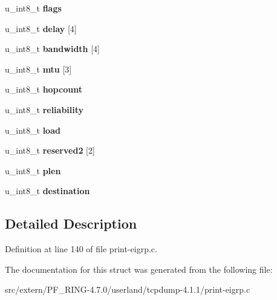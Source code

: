 \begin{DoxyCompactItemize}
\item 
\hypertarget{structeigrp__tlv__ip__ext__t_a009ec12f15263771659f1a5bf27f7c83}{
u\_\-int8\_\-t {\bfseries flags}}
\label{structeigrp__tlv__ip__ext__t_a009ec12f15263771659f1a5bf27f7c83}

\item 
\hypertarget{structeigrp__tlv__ip__ext__t_a27abf8b5a3bb6f018f62065d6fd05079}{
u\_\-int8\_\-t {\bfseries delay} \mbox{[}4\mbox{]}}
\label{structeigrp__tlv__ip__ext__t_a27abf8b5a3bb6f018f62065d6fd05079}

\item 
\hypertarget{structeigrp__tlv__ip__ext__t_a19fe1526d4e680b6b352b8f208ff16d6}{
u\_\-int8\_\-t {\bfseries bandwidth} \mbox{[}4\mbox{]}}
\label{structeigrp__tlv__ip__ext__t_a19fe1526d4e680b6b352b8f208ff16d6}

\item 
\hypertarget{structeigrp__tlv__ip__ext__t_afb90786c027b3776b62ebb812266b859}{
u\_\-int8\_\-t {\bfseries mtu} \mbox{[}3\mbox{]}}
\label{structeigrp__tlv__ip__ext__t_afb90786c027b3776b62ebb812266b859}

\item 
\hypertarget{structeigrp__tlv__ip__ext__t_aa494a7d95710e5a76c14b3e2117b8e87}{
u\_\-int8\_\-t {\bfseries hopcount}}
\label{structeigrp__tlv__ip__ext__t_aa494a7d95710e5a76c14b3e2117b8e87}

\item 
\hypertarget{structeigrp__tlv__ip__ext__t_aec3da19e82874db116a1c7291fafefe2}{
u\_\-int8\_\-t {\bfseries reliability}}
\label{structeigrp__tlv__ip__ext__t_aec3da19e82874db116a1c7291fafefe2}

\item 
\hypertarget{structeigrp__tlv__ip__ext__t_af44074e13efbb025a09d6b44f494aefb}{
u\_\-int8\_\-t {\bfseries load}}
\label{structeigrp__tlv__ip__ext__t_af44074e13efbb025a09d6b44f494aefb}

\item 
\hypertarget{structeigrp__tlv__ip__ext__t_aa0113140cc9dbd7a035832ae3591d4b3}{
u\_\-int8\_\-t {\bfseries reserved2} \mbox{[}2\mbox{]}}
\label{structeigrp__tlv__ip__ext__t_aa0113140cc9dbd7a035832ae3591d4b3}

\item 
\hypertarget{structeigrp__tlv__ip__ext__t_a5beee5649c30f5c85a083001681ffa1b}{
u\_\-int8\_\-t {\bfseries plen}}
\label{structeigrp__tlv__ip__ext__t_a5beee5649c30f5c85a083001681ffa1b}

\item 
\hypertarget{structeigrp__tlv__ip__ext__t_ae8dab30ed6b16bff1fdec95b55f62443}{
u\_\-int8\_\-t {\bfseries destination}}
\label{structeigrp__tlv__ip__ext__t_ae8dab30ed6b16bff1fdec95b55f62443}

\end{DoxyCompactItemize}


\subsection{Detailed Description}


Definition at line 140 of file print-\/eigrp.c.



The documentation for this struct was generated from the following file:\begin{DoxyCompactItemize}
\item 
src/extern/PF\_\-RING-\/4.7.0/userland/tcpdump-\/4.1.1/print-\/eigrp.c\end{DoxyCompactItemize}
